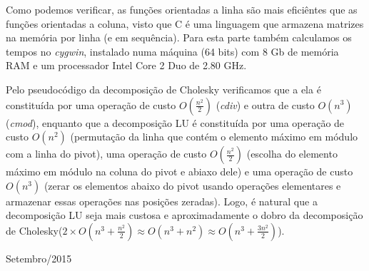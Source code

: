 \documentclass[a4paper,11pt]{article}
\begin{document}
Como podemos verificar, as funções orientadas a linha são mais eficiêntes que as funções orientadas a coluna, visto que C é uma linguagem que armazena matrizes na memória por linha (e em sequência).  Para esta parte também calculamos os tempos no {\it cygwin}, instalado numa máquina (64 bits) com 8 Gb de memória RAM e um processador Intel Core 2 Duo de 2.80 GHz. 

Pelo pseudocódigo da decomposição de Cholesky verificamos que a ela é constituída por uma operação de custo $O(\frac{n^{2}}{2})$ ({\it cdiv}) e outra de custo $O(n^{3})$ ({\it cmod}), enquanto que a decomposição LU é constituída por uma operação de custo $O(n^{2})$ (permutação da linha que contém o elemento máximo em módulo com a linha do pivot), uma operação de custo $O(\frac{n^{2}}{2})$ (escolha do elemento máximo em módulo na coluna do pivot e abiaxo dele) e uma operação de custo $O(n^{3})$ (zerar os elementos abaixo do pivot usando operações elementares e armazenar essas operações nas posições zeradas). Logo, é natural que a decomposição LU seja mais custosa e aproximadamente o dobro da decomposição de Cholesky($2 \times O(n^{3}+\frac{n^{2}}{2}) \approx O(n^{3}+n^{2}) \approx O(n^{3}+\frac{3n^{2}}{2}) $). 

\vfill

\raggedleft
{\sc Setembro/2015}
\end{document}
